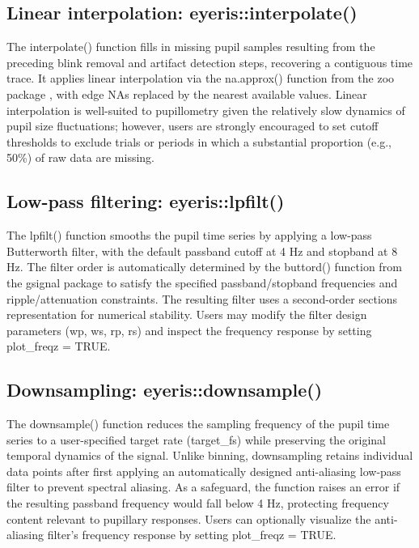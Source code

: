 \subsection{Linear interpolation: eyeris::interpolate()}
The interpolate() function fills in missing pupil samples resulting from the preceding blink removal and artifact detection steps, recovering a contiguous time trace. It applies linear interpolation via the na.approx() function from the zoo package \parencite{zeileis2005zoo}, with edge NAs replaced by the nearest available values. Linear interpolation is well-suited to pupillometry given the relatively slow dynamics of pupil size fluctuations; however, users are strongly encouraged to set cutoff thresholds to exclude trials or periods in which a substantial proportion (e.g., 50\%) of raw data are missing.

\subsection{Low-pass filtering: eyeris::lpfilt()}
The lpfilt() function smooths the pupil time series by applying a low-pass Butterworth filter, with the default passband cutoff at 4 Hz and stopband at 8 Hz. The filter order is automatically determined by the buttord() function from the gsignal package \parencite{vanboxtel2021gsignal} to satisfy the specified passband/stopband frequencies and ripple/attenuation constraints. The resulting filter uses a second-order sections representation for numerical stability. Users may modify the filter design parameters (wp, ws, rp, rs) and inspect the frequency response by setting plot\_freqz = TRUE.

\subsection{Downsampling: eyeris::downsample()}
The downsample() function reduces the sampling frequency of the pupil time series to a user-specified target rate (target\_fs) while preserving the original temporal dynamics of the signal. Unlike binning, downsampling retains individual data points after first applying an automatically designed anti-aliasing low-pass filter to prevent spectral aliasing. As a safeguard, the function raises an error if the resulting passband frequency would fall below 4 Hz, protecting frequency content relevant to pupillary responses. Users can optionally visualize the anti-aliasing filter’s frequency response by setting plot\_freqz = TRUE.

